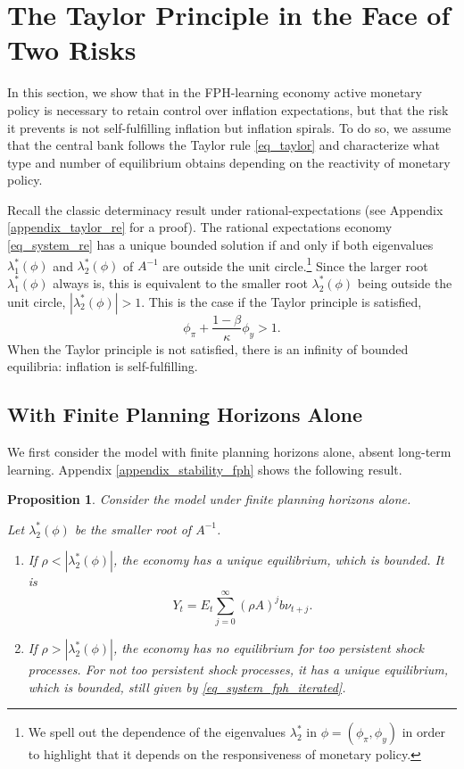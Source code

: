 \documentclass{article}
\newtheorem{proposition}{Proposition}
\begin{document}
\section{The Taylor Principle in the Face of Two Risks}\label{sec_taylorprinciple}
In this section, we show that in the FPH-learning economy active monetary policy is necessary to retain control over inflation expectations, but that the risk it prevents is not self-fulfilling inflation but inflation spirals. To do so, we assume that the central bank follows the Taylor rule \eqref{eq_taylor} and characterize what type and number of equilibrium obtains depending on the reactivity of monetary policy. 

Recall the classic determinacy result under rational-expectations (see Appendix \ref{appendix_taylor_re} for a proof). The rational expectations economy \eqref{eq_system_re} has a unique bounded solution if and only if both eigenvalues $\lambda_1^*(\phi)$ and $\lambda_2^*(\phi)$ of $A^{-1}$ are outside the unit circle.\footnote{We spell out the dependence of the eigenvalues $\lambda_2^*$ in $\phi=(\phi_\pi,\phi_y)$ in order to highlight that it depends on the responsiveness of monetary policy.} Since the larger root $\lambda_1^*(\phi)$ always is, this is equivalent to the smaller root $\lambda_2^*(\phi)$ being outside the unit circle, $|\lambda_2^*(\phi)|>1$. This is the case if the Taylor principle is satisfied,
\begin{equation}
\phi_{\pi} + \frac{1-\beta}{\kappa} \phi_y >1.\label{eq_taylorprinciple}
\end{equation}
When the Taylor principle is not satisfied, there is an infinity of bounded equilibria: inflation is self-fulfilling.

\subsection{With Finite Planning Horizons Alone}
We first consider the model with finite planning horizons alone, absent long-term learning. Appendix \ref{appendix_stability_fph} shows the following result.
\begin{proposition}\label{proposition_taylorprinciple_fphonly}
	Consider the model under finite planning horizons alone.
	
	Let $\lambda_2^*(\phi)$ be the smaller root of $A^{-1}$.
	\begin{enumerate}
		\item If $\rho<|\lambda_2^*(\phi)|$, the economy has a unique equilibrium, which is bounded. It is
		\begin{equation}
		Y_t = E_t \sum_{j=0}^{\infty} (\rho A)^j b \nu_{t+j}.\label{eq_system_fph_iterated}
		\end{equation}
		\item If $\rho>|\lambda_2^*(\phi)|$, the economy has no equilibrium for too persistent shock processes. For not too persistent shock processes, it has a unique equilibrium, which is bounded, still given by \eqref{eq_system_fph_iterated}.
	\end{enumerate}
\end{proposition}
\end{document}
